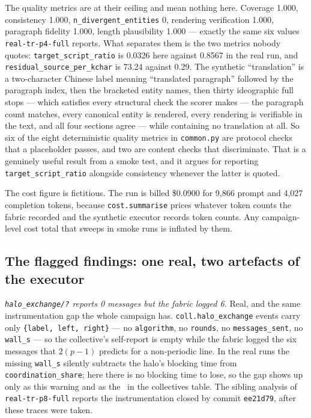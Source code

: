 \documentclass[11pt]{article}
\begin{document}
The quality metrics are at their ceiling and mean nothing here. Coverage 1.000, consistency
1.000, \texttt{n\_divergent\_entities} 0, rendering verification 1.000, paragraph fidelity 1.000,
length plausibility 1.000 --- exactly the same six values \texttt{real-tr-p4-full} reports. What
separates them is the two metrics nobody quotes: \texttt{target\_script\_ratio} is 0.0326 here
against 0.8567 in the real run, and \texttt{residual\_source\_per\_kchar} is 73.24 against 0.29.
The synthetic ``translation'' is a two-character Chinese label meaning ``translated paragraph''
followed by the paragraph index, then the bracketed entity names, then thirty ideographic full
stops --- which satisfies every structural check the scorer
makes --- the paragraph count matches, every canonical entity is rendered, every rendering is
verifiable in the text, and all four sections agree --- while containing no translation at all. So
six of the eight deterministic quality metrics in \texttt{common.py} are protocol checks that a
placeholder passes, and two are content checks that discriminate. That is a genuinely useful
result from a smoke test, and it argues for reporting
\texttt{target\_script\_ratio} alongside consistency whenever the latter is quoted.

The cost figure is fictitious. The run is billed \$0.0900 for 9{,}866 prompt and 4{,}027
completion tokens, because \texttt{cost.summarise} prices whatever token counts the fabric
recorded and the synthetic executor records token counts. Any campaign-level cost total that
sweeps in smoke runs is inflated by them.

\subsection*{The flagged findings: one real, two artefacts of the executor}

 \emph{\texttt{halo\_exchange/?} reports 0 messages but the fabric logged 6.}
Real, and the same instrumentation gap the whole campaign has. \texttt{coll.halo\_exchange} events
carry only \texttt{\{label, left, right\}} --- no \texttt{algorithm}, no \texttt{rounds}, no
\texttt{messages\_sent}, no \texttt{wall\_s} --- so the collective's self-report is empty while the
fabric logged the six messages that $2(p-1)$ predicts for a non-periodic line. In the real runs
the missing \texttt{wall\_s} silently subtracts the halo's blocking time from
\texttt{coordination\_share}; here there is no blocking time to lose, so the gap shows up only as
this warning and as the \modelna\ in the collectives table. The sibling analysis of
\texttt{real-tr-p8-full} reports the instrumentation closed by commit \texttt{ee21d79}, after
these traces were taken.
\end{document}
